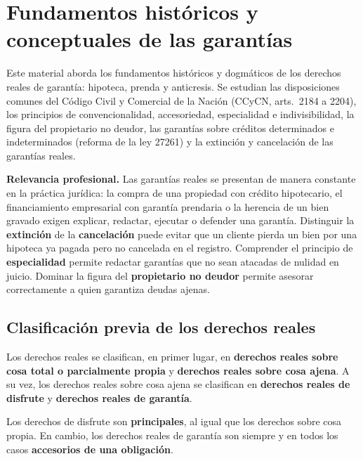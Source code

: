 \documentclass[12pt,oneside]{book}
\begin{document}
\chapter[Fundamentos históricos y conceptuales]{Fundamentos históricos y conceptuales de las garantías}

Este material aborda los fundamentos históricos y dogmáticos de los derechos reales de garantía: hipoteca, prenda y anticresis. Se estudian las disposiciones comunes del Código Civil y Comercial de la Nación (CCyCN, arts.~2184 a 2204), los principios de convencionalidad, accesoriedad, especialidad e indivisibilidad, la figura del propietario no deudor, las garantías sobre créditos determinados e indeterminados (reforma de la ley 27261) y la extinción y cancelación de las garantías reales.

\begin{note}
\textbf{Relevancia profesional.} Las garantías reales se presentan de manera constante en la práctica jurídica: la compra de una propiedad con crédito hipotecario, el financiamiento empresarial con garantía prendaria o la herencia de un bien gravado exigen explicar, redactar, ejecutar o defender una garantía. Distinguir la \textbf{extinción} de la \textbf{cancelación} puede evitar que un cliente pierda un bien por una hipoteca ya pagada pero no cancelada en el registro. Comprender el principio de \textbf{especialidad} permite redactar garantías que no sean atacadas de nulidad en juicio. Dominar la figura del \textbf{propietario no deudor} permite asesorar correctamente a quien garantiza deudas ajenas.
\end{note}

\section{Clasificación previa de los derechos reales}

Los derechos reales se clasifican, en primer lugar, en \textbf{derechos reales sobre cosa total o parcialmente propia} y \textbf{derechos reales sobre cosa ajena}. A su vez, los derechos reales sobre cosa ajena se clasifican en \textbf{derechos reales de disfrute} y \textbf{derechos reales de garantía}.

Los derechos de disfrute son \textbf{principales}, al igual que los derechos sobre cosa propia. En cambio, los derechos reales de garantía son siempre y en todos los casos \textbf{accesorios de una obligación}.
\end{document}
